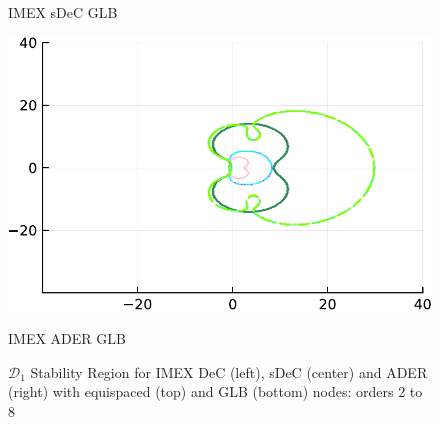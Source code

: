 \begin{figure}
\begin{minipage}[t]{0.32\textwidth}
	\centerline{IMEX sDeC GLB}
	\end{minipage}
	\begin{minipage}[t]{0.32\textwidth}
	\includegraphics[width=\textwidth]{pdf/odepics/ImExD1_IMEXADER_gaussLobatto_range=40-crop.pdf}
	\centerline{IMEX ADER GLB}
	\end{minipage}
	\caption{$\mathcal{D}_1$ Stability Region for IMEX DeC (left), sDeC (center) and ADER (right) with equispaced (top) and GLB (bottom) nodes: orders 2 to 8}
\label{fig: HundsdorferD1_IMEX}
\end{figure}

